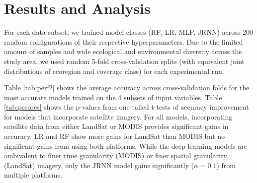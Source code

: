 \documentclass{article} %
\begin{document}
\section{Results and Analysis}
For each data subset, we trained model classes (RF, LR, MLP, JRNN) across 200 random configurations of their respective hyperparameters. 
Due to the limited amount of samples and wide ecological and environmental diversity across the study area, we used random 5-fold cross-validation splits (with equivalent joint distributions of ecoregion and coverage class) for each experimental run. 

Table \ref{tab:perf2} shows the average accuracy across cross-validation folds for the most accurate models trained on the 4 subsets of input variables.
Table \ref{tab:pscores} shows the p-values from one-tailed t-tests of accuracy improvement for models that incorporate satellite imagery. For all models, incorporating satellite data from either LandSat or MODIS provides significant gains in accuracy. LR and RF show more gains for LandSat than MODIS but no significant gains from using both platforms. While the deep learning models are ambivalent to finer time granularity (MODIS) or finer spatial granularity (LandSat) imagery, only the JRNN model gains significantly ($\alpha=0.1$) from multiple platforms. 
 
\end{document}
